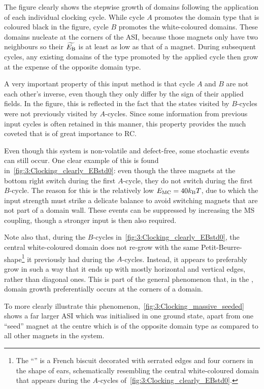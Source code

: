 The figure clearly shows the stepwise growth of domains following the application of each individual clocking cycle.
While cycle $A$ promotes the domain type that is coloured black in the figure, cycle $B$ promotes the white-coloured domains.
These domains nucleate at the corners of the ASI, because those magnets only have two neighbours so their  $\widetilde{E_\mathrm{B}}$ is at least as low as that of a  magnet.
During subsequent cycles, any existing domains of the type promoted by the applied cycle then grow at the expense of the opposite domain type. \par
A very important property of this input method is that cycle $A$ and $B$ are not each other's inverse, even though they only differ by the sign of their applied fields.
In the figure, this is reflected in the fact that the states visited by $B$-cycles were not previously visited by $A$-cycles.
Since some information from previous input cycles is often retained in this manner, this property provides the much coveted  that is of great importance to RC. \par
Even though this system is non-volatile and defect-free, some stochastic events can still occur.
One clear example of this is found in~\cref{fig:3:Clocking_clearly_EBstd0}: even though the three magnets at the bottom right switch during the first $A$-cycle, they do not switch during the first $B$-cycle.
The reason for this is the relatively low  $\EMC=40\kBT$, due to which the input strength must strike a delicate balance to avoid switching magnets that are not part of a domain wall.
These events can be suppressed by increasing the MS coupling, though a stronger input is then also required. \par %

Note also that, during the $B$-cycles in~\cref{fig:3:Clocking_clearly_EBstd0}, the central white-coloured domain does not re-grow with the same Petit-Beurre-shape\footnote{
	The ``'' is a French biscuit decorated with serrated edges and four corners in the shape of ears, schematically resembling the central white-coloured domain that appears during the $A$-cycles of~\cref{fig:3:Clocking_clearly_EBstd0}.
} it previously had during the $A$-cycles.
Instead, it appears to preferably grow in such a way that it ends up with mostly horizontal and vertical edges, rather than diagonal ones.
This is part of the general phenomenon that, in the , domain growth preferentially occurs at the corners of a domain. \par
To more clearly illustrate this phenomenon,~\cref{fig:3:Clocking_massive_seeded} shows a far larger ASI which was initialised in one ground state, apart from one ``seed'' magnet at the centre which is of the opposite domain type as compared to all other magnets in the system.

